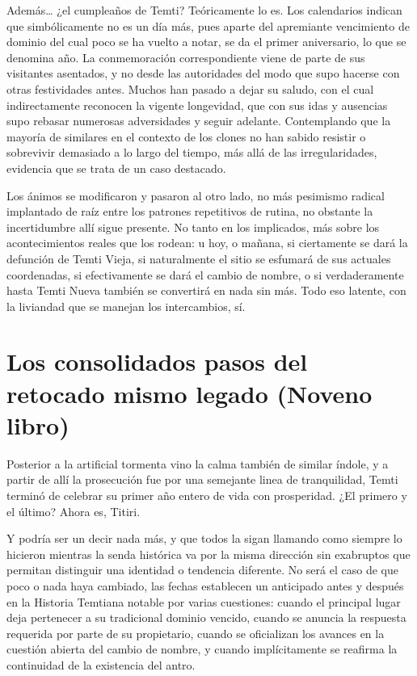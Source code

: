 \documentclass[
]{book}
\begin{document}
Además\ldots{} ¿el cumpleaños de Temti? Teóricamente lo es. Los calendarios indican que simbólicamente no es un día más, pues aparte del apremiante vencimiento de dominio del cual poco se ha vuelto a notar, se da el primer aniversario, lo que se denomina año. La conmemoración correspondiente viene de parte de sus visitantes asentados, y no desde las autoridades del modo que supo hacerse con otras festividades antes. Muchos han pasado a dejar su saludo, con el cual indirectamente reconocen la vigente longevidad, que con sus idas y ausencias supo rebasar numerosas adversidades y seguir adelante. Contemplando que la mayoría de similares en el contexto de los clones no han sabido resistir o sobrevivir demasiado a lo largo del tiempo, más allá de las irregularidades, evidencia que se trata de un caso destacado.

Los ánimos se modificaron y pasaron al otro lado, no más pesimismo radical implantado de raíz entre los patrones repetitivos de rutina, no obstante la incertidumbre allí sigue presente. No tanto en los implicados, más sobre los acontecimientos reales que los rodean: u hoy, o mañana, si ciertamente se dará la defunción de Temti Vieja, si naturalmente el sitio se esfumará de sus actuales coordenadas, si efectivamente se dará el cambio de nombre, o si verdaderamente hasta Temti Nueva también se convertirá en nada sin más. Todo eso latente, con la liviandad que se manejan los intercambios, sí.

\hypertarget{los-consolidados-pasos-del-retocado-mismo-legado-noveno-libro}{%
\chapter{Los consolidados pasos del retocado mismo legado (Noveno libro)}\label{los-consolidados-pasos-del-retocado-mismo-legado-noveno-libro}}

Posterior a la artificial tormenta vino la calma también de similar índole, y a partir de allí la prosecución fue por una semejante linea de tranquilidad, Temti terminó de celebrar su primer año entero de vida con prosperidad. ¿El primero y el último? Ahora es, Titiri.

Y podría ser un decir nada más, y que todos la sigan llamando como siempre lo hicieron mientras la senda histórica va por la misma dirección sin exabruptos que permitan distinguir una identidad o tendencia diferente. No será el caso de que poco o nada haya cambiado, las fechas establecen un anticipado antes y después en la Historia Temtiana notable por varias cuestiones: cuando el principal lugar deja pertenecer a su tradicional dominio vencido, cuando se anuncia la respuesta requerida por parte de su propietario, cuando se oficializan los avances en la cuestión abierta del cambio de nombre, y cuando implícitamente se reafirma la continuidad de la existencia del antro.
\end{document}

